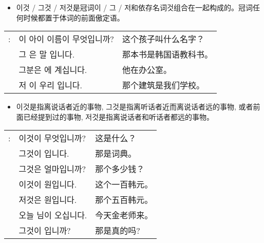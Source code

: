 \begin{grammar}
    \begin{grammarsect}[\kr 이것 / 그것 / 저것]
    \begin{itemize}
        \item {\kr 이것 / 그것 / 저것}是冠词{\kr 이 / 그 / 저}和依存名词{\kr 것}组合在一起构成的。冠词任何时候都置于体词的前面傲定语。
    \end{itemize}
    \begin{tabular}{lll}
        \kr \ruby{例}{예}: &\kr 이 아이 이름이 무엇입니까?&这个孩子叫什么名字？\\
        &\kr 그 \ruby{冊}{책}은 \ruby{韓國}{한국}말 \ruby{敎科書}{교과서}입니다.&那本书是韩国语教科书。\\
        &\kr 그분은 \ruby{事務室}{사무실}에 계십니다.&他在办公室。\\
        &\kr 저 \ruby{建物}{건물}이 우리 \ruby{學校}{학교}입니다.&那个建筑是我们学校。\\
    \end{tabular}
    \begin{itemize}
        \item {\kr 이것}是指离说话者近的事物, {\kr 그것}是指离听话者近而离说话者远的事物, 或者前面已经提到过的事物, 저것是指离说话者和听话者都远的事物。
    \end{itemize}
    \begin{tabular}{lll}
        \kr \ruby{例}{예}: &\kr 이것이 무엇입니까?&这是什么？\\
        &\kr 그것이 \ruby{辭典}{사전}입니다.&那是词典。\\
        &\kr 그것은 얼마입니까?&那个多少钱？\\
        &\kr 이것이 \ruby{百}{백} 원입니다.&这个一百韩元。\\
        &\kr 저것은 \ruby{五百}{오백} 원입니다.&那个五百韩元。\\
        &\kr 오늘 \ruby{金}{김} \ruby{先生}{선생}님이 오십니다.&今天金老师来。\\
        &\kr 그것이 \ruby{事實}{사실}입니까?&那是真的吗?
    \end{tabular}\\
    \end{grammarsect}
\end{grammar}
